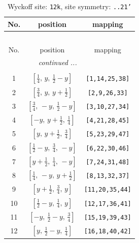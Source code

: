 \documentclass[fleqn,8pt]{jsarticle}
\begin{document}
\begin{longtable}{ccc}
\caption{Wyckoff site: {\tt 12k}, site symmetry: {\tt ..21'}}
 \\
 \hline \hline
No. & position & mapping \\ \hline \endfirsthead

\multicolumn{2}{l}{\tablename\ \thetable{}} \\
 \hline \hline
No. & position & mapping \\ \hline \endhead

 \hline \hline
\multicolumn{2}{r}{\footnotesize\it continued ...} \\ \endfoot

 \hline \hline
\multicolumn{2}{r}{} \\ \endlastfoot

1 & $\left[ \frac{1}{4},\, y,\, \frac{1}{2} - y \right]$ & {\tt [1,14,25,38]} \\ \hline
2 & $\left[ \frac{3}{4},\, y,\, y + \frac{1}{2} \right]$ & {\tt [2,9,26,33]} \\ \hline
3 & $\left[ \frac{3}{4},\, - y,\, \frac{1}{2} - y \right]$ & {\tt [3,10,27,34]} \\ \hline
4 & $\left[ - y,\, y + \frac{1}{2},\, \frac{1}{4} \right]$ & {\tt [4,21,28,45]} \\ \hline
5 & $\left[ y,\, y + \frac{1}{2},\, \frac{3}{4} \right]$ & {\tt [5,23,29,47]} \\ \hline
6 & $\left[ \frac{1}{2} - y,\, \frac{3}{4},\, - y \right]$ & {\tt [6,22,30,46]} \\ \hline
7 & $\left[ y + \frac{1}{2},\, \frac{1}{4},\, - y \right]$ & {\tt [7,24,31,48]} \\ \hline
8 & $\left[ \frac{1}{4},\, - y,\, y + \frac{1}{2} \right]$ & {\tt [8,13,32,37]} \\ \hline
9 & $\left[ y + \frac{1}{2},\, \frac{3}{4},\, y \right]$ & {\tt [11,20,35,44]} \\ \hline
10 & $\left[ \frac{1}{2} - y,\, \frac{1}{4},\, y \right]$ & {\tt [12,17,36,41]} \\ \hline
11 & $\left[ - y,\, \frac{1}{2} - y,\, \frac{3}{4} \right]$ & {\tt [15,19,39,43]} \\ \hline
12 & $\left[ y,\, \frac{1}{2} - y,\, \frac{1}{4} \right]$ & {\tt [16,18,40,42]} \\
\end{longtable}
\renewcommand{\arraystretch}{1.2}
\end{document}
